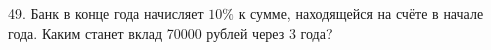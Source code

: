 49. Банк в конце года начисляет $10\%$ к сумме, находящейся на счёте в начале года. Каким станет вклад 70000 рублей через 3 года?\\
